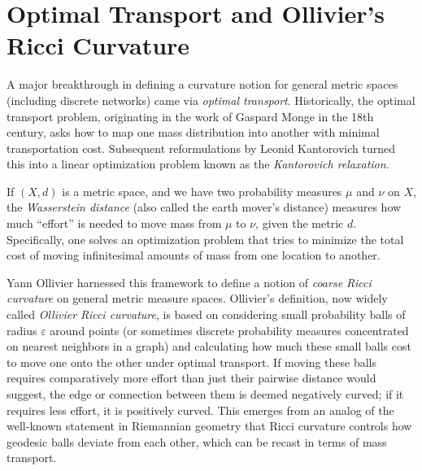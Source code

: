 \section{Optimal Transport and Ollivier's Ricci Curvature}
A major breakthrough in defining a curvature notion for general metric spaces (including discrete networks) came via \emph{optimal transport}. Historically, the optimal transport problem, originating in the work of Gaspard Monge in the 18th century, asks how to map one mass distribution into another with minimal transportation cost. Subsequent reformulations by Leonid Kantorovich turned this into a linear optimization problem known as the \emph{Kantorovich relaxation}. 

If $(X, d)$ is a metric space, and we have two probability measures $\mu$ and $\nu$ on $X$, the \emph{Wasserstein distance} (also called the earth mover’s distance) measures how much ``effort'' is needed to move mass from $\mu$ to $\nu$, given the metric $d$. Specifically, one solves an optimization problem that tries to minimize the total cost of moving infinitesimal amounts of mass from one location to another. 

Yann Ollivier harnessed this framework to define a notion of \emph{coarse Ricci curvature} on general metric measure spaces. Ollivier’s definition, now widely called \emph{Ollivier Ricci curvature}, is based on considering small probability balls of radius $\varepsilon$ around points (or sometimes discrete probability measures concentrated on nearest neighbors in a graph) and calculating how much these small balls cost to move one onto the other under optimal transport. If moving these balls requires comparatively more effort than just their pairwise distance would suggest, the edge or connection between them is deemed negatively curved; if it requires less effort, it is positively curved. This emerges from an analog of the well-known statement in Riemannian geometry that Ricci curvature controls how geodesic balls deviate from each other, which can be recast in terms of mass transport.
